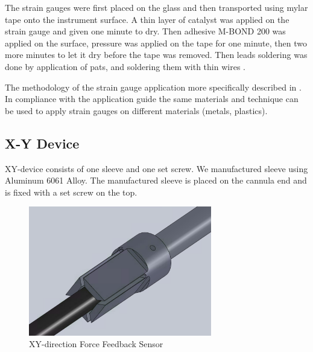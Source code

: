 	The strain gauges were first placed on the glass and then transported using mylar tape onto the instrument surface. A thin layer of catalyst was applied on the strain gauge and given one minute to dry. Then adhesive M-BOND 200 was applied on the surface, pressure was applied on the tape for one minute, then two more minutes to let it dry before the tape was removed. Then leads soldering was done by application of pats, and soldering them with thin wires \cite{youtube}.

	The methodology of the strain gauge application more specifically described in \cite{StrGugeInst}. In compliance with the application guide the same materials and technique can be used to apply strain gauges on different materials (metals, plastics).

\subsection{X-Y Device}
\label{sec:xyDir}

XY-device consists of one sleeve and one set screw. We manufactured sleeve using Aluminum 6061 Alloy. %
The manufactured sleeve is placed on the cannula end and is fixed with a set screw on the top.

\begin{figure}[h]
	\begin{center}
		\includegraphics[width=80mm]{fig/methods/xy_dev_cl.png}
	\end{center}
	\vspace{-4mm}
	\caption[XY-direction Force Feedback Sensor]
	{XY-direction Force Feedback Sensor}
	\label{fig:xy-direction}
	\vspace{-2mm}
\end{figure}

